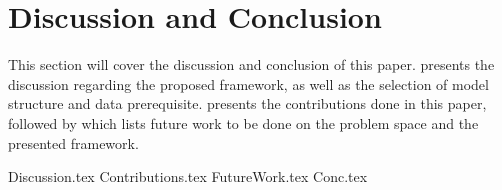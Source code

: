 \chapter{Discussion and Conclusion}

\label{section:Discussion}


This section will cover the discussion and conclusion of this paper.
 presents the discussion regarding the proposed framework,
as well as the selection of model structure and data prerequisite.
 presents the contributions done in this paper,
followed by  which lists future work to be done on the problem space and the presented framework.


{Discussion.tex}
{Contributions.tex}
{FutureWork.tex}
{Conc.tex}
